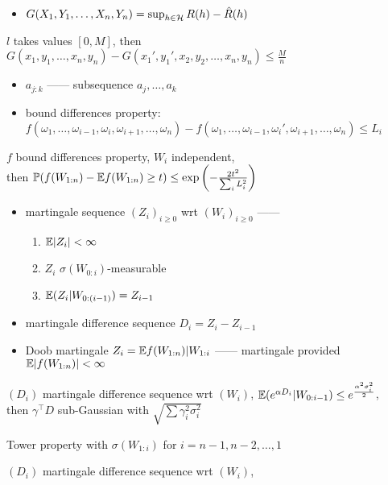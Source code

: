 \begin{itemize}
    \item $G(X_1, Y_1, \dots, X_n, Y_n) = \sup_{h \in \mathcal{H}} R(h) - \hat R(h)$
\end{itemize}
\begin{fact}
    $l$ takes values $[0, M]$, then $G(x_1, y_1, \dots, x_n, y_n) - G(x_1', y_1', x_2, y_2, \dots, x_n, y_n)\leq \frac{M}{n}$
\end{fact}

\begin{itemize}
    \item $a_{j:k}$ ------ subsequence $a_j, \dots, a_k$
    \item bound differences property:\\
    $f(\omega_1, \dots, \omega_{i-1}, \omega_i, \omega_{i+1}, \dots, \omega_n) - f(\omega_1, \dots, \omega_{i-1}, \omega_i', \omega_{i+1}, \dots, \omega_n) \leq L_i$
\end{itemize}

\begin{thm}
    $f$ bound differences property, $W_i$ independent,\\
    then $\mathbb{P}(f(W_{1:n}) - \mathbb{E} f(W_{1:n}) \geq t) \leq \exp \left( - \frac{2t^2}{\sum_i L_i^2} \right)$
\end{thm}

\begin{itemize}
    \item martingale sequence $(Z_i)_{i \geq 0}$ wrt $(W_i)_{i \geq 0}$ ------
    \begin{enumerate}
        \item $\mathbb{E}|Z_i| < \infty$
        \item $Z_i$ $\sigma(W_{0:i})$-measurable
        \item $\mathbb{E} (Z_i|W_{0:(i-1)}) = Z_{i-1}$
    \end{enumerate}
    \item martingale difference sequence $D_i = Z_i - Z_{i-1}$
    \item Doob martingale $Z_i = \mathbb{E} f(W_{1:n}) | W_{1:i}$ ------ martingale provided $\mathbb{E} |f(W_{1:n})| < \infty$
\end{itemize}

\begin{lemma}
    $(D_i)$ martingale difference sequence wrt $(W_i)$, $\mathbb{E} (e^{\alpha D_i} | W_{0:{i-1}}) \leq e^{\frac{\alpha^2 \sigma_i^2}{2}}$, \\
    then $\gamma^\top D$ sub-Gaussian with $\sqrt{\sum \gamma_i^2 \sigma_i^2}$
\end{lemma}
\begin{pf}
    Tower property with $\sigma(W_{1:i})$ for $i=n-1, n-2, \dots, 1$
\end{pf}

\begin{thm}
    $(D_i)$ martingale difference sequence wrt $(W_i)$,
\end{thm}